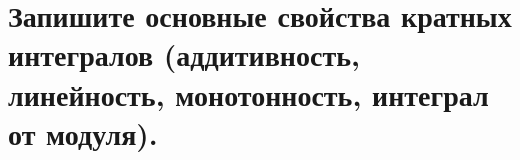 \section{Запишите основные свойства кратных интегралов (аддитивность, линейность, монотонность, интеграл от модуля).}
